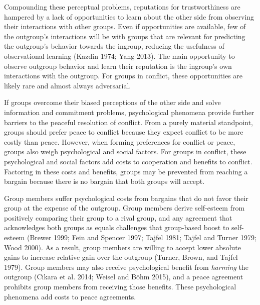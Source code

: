 \documentclass[11pt]{article}
\begin{document}
Compounding these perceptual problems, reputations for trustworthiness
are hampered by a lack of opportunities to learn about the other side
from observing their interactions with other groups. Even if
opportunities are available, few of the outgroup's interactions will be
with groups that are relevant for predicting the outgroup's behavior
towards the ingroup, reducing the usefulness of observational learning
(Kazdin 1974; Yang 2013). The main opportunity to observe outgroup
behavior and learn their reputation is the ingroup's own interactions
with the outgroup. For groups in conflict, these opportunities are
likely rare and almost always adversarial.

If groups overcome their biased perceptions of the other side and solve
information and commitment problems, psychological phenomena provide
further barriers to the peaceful resolution of conflict. From a purely
material standpoint, groups should prefer peace to conflict because they
expect conflict to be more costly than peace. However, when forming
preferences for conflict or peace, groups also weigh psychological and
social factors. For groups in conflict, these psychological and social
factors add costs to cooperation and benefits to conflict. Factoring in
these costs and benefits, groups may be prevented from reaching a
bargain because there is no bargain that both groups will accept.

Group members suffer psychological costs from bargains that do not favor
their group at the expense of the outgroup. Group members derive
self-esteem from positively comparing their group to a rival group, and
any agreement that acknowledges both groups as equals challenges that
group-based boost to self-esteem (Brewer 1999; Fein and Spencer 1997;
Tajfel 1981; Tajfel and Turner 1979; Wood 2000). As a result, group
members are willing to accept lower absolute gains to increase relative
gain over the outgroup (Turner, Brown, and Tajfel 1979). Group members
may also receive psychological benefit from \emph{harming} the outgroup
(Cikara et al. 2014; Weisel and Böhm 2015), and a peace agreement
prohibits group members from receiving those benefits. These
psychological phenomena add costs to peace agreements.
\end{document}
